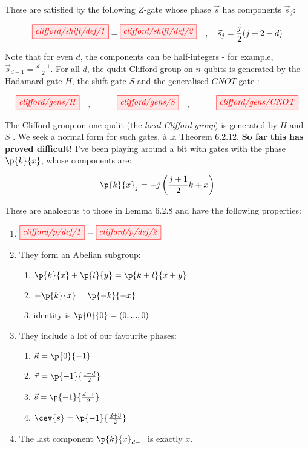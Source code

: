 \documentclass[11pt, oneside]{article}      %
\begin{document}
These are satisfied by the following $Z$-gate whose phase $\vec{s}$ has components $\vec{s}_j$:

\begin{equation}
	\tikzfig{clifford/shift/def/1} = \tikzfig{clifford/shift/def/2} \quad,\quad 
	\vec{s}_j = \frac{j}{2}(j + 2 - d)
\end{equation}

Note that for even $d$, the components can be half-integers - for example, $\vec{s}_{d-1} = \frac{d-1}{2}$. For all $d$, the qudit Clifford group on $n$ qubits is generated by the Hadamard gate $H$, the shift gate $S$ and the generalised $CNOT$ gate \citep{Farinholt_2014}:

\begin{equation}
	\tikzfig{clifford/gens/H} \quad,\hspace{30pt}
	\tikzfig{clifford/gens/S} \quad,\hspace{30pt}
	\tikzfig{clifford/gens/CNOT}
\end{equation}

The Clifford group on one qudit (the \emph{local Clifford group}) is generated by $H$ and $S$ \citep{Farinholt_2014}. We seek a normal form for such gates, \`{a} la \citep{Wang_2018}{Theorem 6.2.12}. \textbf{So far this has proved difficult!} I've been playing around a bit with gates with the phase $\p{k}{x}$, whose components are:

\begin{equation}
	 \p{k}{x}_j = -j\left(\frac{j+1}{2}k + x\right)
\end{equation} 

These are analogous to those in \cite{Wang_2018}{Lemma 6.2.8} and have the following properties:

\begin{enumerate}
	\item $\tikzfig{clifford/p/def/1} = \tikzfig{clifford/p/def/2}$
	\item They form an Abelian subgroup: 
	\begin{enumerate}
		\item $\p{k}{x} + \p{l}{y} = \p{k+l}{x+y}$
		\item $-\p{k}{x} = \p{-k}{-x}$
		\item identity is $\p{0}{0} = (0, ..., 0)$
	\end{enumerate}
	\item They include a lot of our favourite phases:
	\begin{enumerate}
	 	\item $\vec{\kappa} = \p{0}{-1}$
	 	\item $\vec{\tau} = \p{-1}{\frac{1-d}{2}}$
	 	\item $\vec{s} = \p{-1}{\frac{d-1}{2}}$
	 	\item $\cev{s} = \p{-1}{\frac{d+3}{2}}$
	 \end{enumerate}
	\item The last component $\p{k}{x}_{d-1}$ is exactly $x$.
\end{enumerate}
\end{document}
